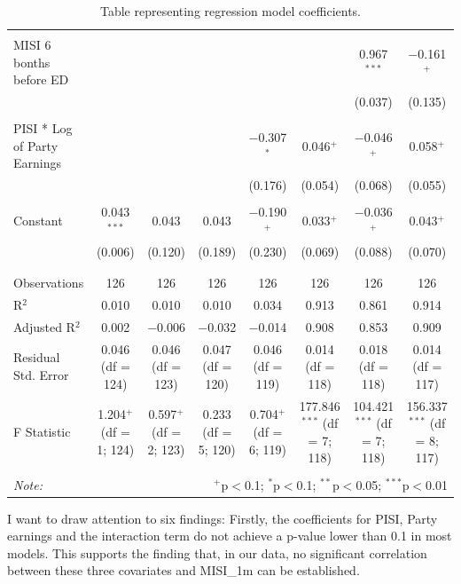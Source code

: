 \documentclass[11pt,a4paper]{article}
\begin{document}
\begin{table}
{\begin{tabular}{@{\extracolsep{50pt}}lccccccc}
      & & & & & & & \\ 
     MISI 6 bonths before ED &  &  &  &  &  & 0.967$^{***}$ & $-$0.161$^{+}$ \\ 
      &  &  &  &  &  & (0.037) & (0.135) \\ 
      & & & & & & & \\ 
     PISI * Log of Party Earnings &  &  &  & $-$0.307$^{*}$ & 0.046$^{+}$ & $-$0.046$^{+}$ & 0.058$^{+}$ \\ 
      &  &  &  & (0.176) & (0.054) & (0.068) & (0.055) \\ 
      & & & & & & & \\ 
     Constant & 0.043$^{***}$ & 0.043 & 0.043 & $-$0.190$^{+}$ & 0.033$^{+}$ & $-$0.036$^{+}$ & 0.043$^{+}$ \\ 
      & (0.006) & (0.120) & (0.189) & (0.230) & (0.069) & (0.088) & (0.070) \\ 
      & & & & & & & \\ 
    \hline \\[-1.8ex] 
    Observations & 126 & 126 & 126 & 126 & 126 & 126 & 126 \\ 
    R$^{2}$ & 0.010 & 0.010 & 0.010 & 0.034 & 0.913 & 0.861 & 0.914 \\ 
    Adjusted R$^{2}$ & 0.002 & $-$0.006 & $-$0.032 & $-$0.014 & 0.908 & 0.853 & 0.909 \\ 
    Residual Std. Error & 0.046 (df = 124) & 0.046 (df = 123) & 0.047 (df = 120) & 0.046 (df = 119) & 0.014 (df = 118) & 0.018 (df = 118) & 0.014 (df = 117) \\ 
    F Statistic & 1.204$^{+}$ (df = 1; 124) & 0.597$^{+}$ (df = 2; 123) & 0.233 (df = 5; 120) & 0.704$^{+}$ (df = 6; 119) & 177.846$^{***}$ (df = 7; 118) & 104.421$^{***}$ (df = 7; 118) & 156.337$^{***}$ (df = 8; 117) \\ 
    \hline 
    \hline \\[-1.8ex] 
    \textit{Note:}  & \multicolumn{7}{r}{$^{+}$p$<$0.1; $^{*}$p$<$0.1; $^{**}$p$<$0.05; $^{***}$p$<$0.01} \\ 
    \end{tabular} 
    }
    \caption{Table representing regression model coefficients.}
    \label{tab:tab5}
\end{table}


I want to draw attention to six findings: Firstly, the coefficients for PISI, Party earnings and the interaction term do not achieve a p-value lower than 0.1 in most models. This supports the finding that, in our data, no significant correlation between these three covariates and MISI\_1m can be established.
\end{document}
